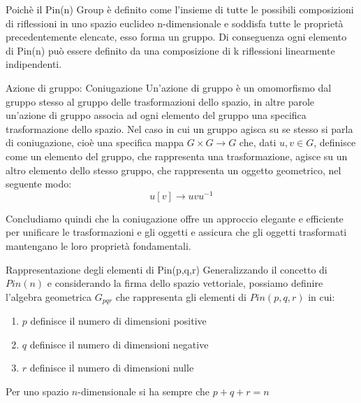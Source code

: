 \begin{frame}
   Poichè il Pin(n) Group è definito come l’insieme di tutte le possibili composizioni di riflessioni in uno spazio euclideo n-dimensionale
   e soddisfa tutte le proprietà precedentemente elencate, esso forma un gruppo.
   Di conseguenza ogni elemento di Pin(n) può essere definito da una composizione di k riflessioni linearmente indipendenti.
\end{frame}

\begin{frame}{Azione di gruppo: Coniugazione}
    Un’azione di gruppo è un omomorfismo dal gruppo stesso al gruppo delle trasformazioni dello spazio,
    in altre parole un’azione di gruppo associa ad ogni elemento del gruppo una specifica trasformazione dello spazio. 
    Nel caso in cui un gruppo agisca su se stesso si parla di coniugazione, cioè una specifica mappa \(G \times G\to G\) che,
    dati \(u, v \in G\), definisce come un elemento del gruppo, che rappresenta una trasformazione,
    agisce su un altro elemento dello stesso gruppo, che rappresenta un oggetto geometrico, 
    nel seguente modo:
   \begin{equation}
      u[v]\to uvu^{-1}
   \end{equation}
\end{frame}

\begin{frame}
    Concludiamo quindi che la coniugazione offre un approccio elegante e efficiente per unificare le trasformazioni e gli oggetti e assicura che gli oggetti trasformati mantengano le loro proprietà fondamentali. 
\end{frame}

\begin{frame}{Rappresentazione degli elementi di Pin(p,q,r)}
   Generalizzando il concetto di \(Pin(n)\) e considerando la firma dello spazio vettoriale, possiamo definire l’algebra geometrica \(G_{pqr}\)  che rappresenta gli elementi di  \(Pin(p,q,r)\) in cui:
   \begin{enumerate}
      \item \(p\) definisce il numero di dimensioni positive
      \item \(q\) definisce il numero di dimensioni negative
      \item \(r\) definisce il numero di dimensioni nulle
   \end{enumerate}
   Per uno spazio \(n\)-dimensionale si ha sempre che \(p+q+r = n\)
\end{frame}

